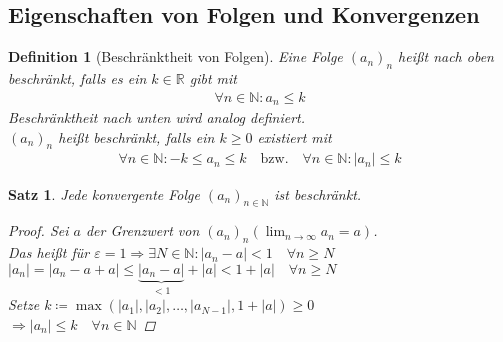 \documentclass[11pt, twoside, a4paper]{article}
\theoremstyle{plain}
\newtheorem{definition}[blockelement]{Definition}
\newtheorem{satz}[blockelement]{Satz}
\newcommand{\pair}[1]{\left(#1\right)}
\newcommand{\abs}[1]{\left|#1\right|}
\newcommand{\impl}[0]{\Rightarrow{}}
\newcommand{\definedas}[0]{\coloneqq}
\newcommand{\fromto}{\rightarrow{}}
\newcommand{\naturalnumbers}{\mathbb{N}}
\newcommand{\realnumbers}{\mathbb{R}}
\begin{document}

    \subsection{Eigenschaften von Folgen und Konvergenzen}

    \begin{definition}[Beschränktheit von Folgen]
        Eine Folge $(a_n)_n$ heißt nach oben beschränkt, falls es ein $k\in\realnumbers$ gibt mit
        \begin{align*}
            \forall n\in \naturalnumbers\colon a_n \leq k\tag{$k$ ist obere Schranke für $(a_n)_n$}
        \end{align*}
        Beschränktheit nach unten wird analog definiert.\\
        $(a_n)_n$ heißt beschränkt, falls ein $k\geq 0$ existiert mit
        \begin{align*}
            \forall n\in\naturalnumbers\colon -k \leq a_n \leq k\quad \text{bzw.}\quad \forall n\in\naturalnumbers\colon \abs{a_n} \leq k
        \end{align*}
    \end{definition}

    \begin{satz}
        \label{satz:konv-folg-beschr}
        Jede konvergente Folge $(a_n)_{n\in\naturalnumbers}$ ist beschränkt.
        \begin{proof}
            Sei $a$ der Grenzwert von $(a_n)_n$\quad $\pair{\lim_{n\fromto\infty} a_n = a}$.\\
            Das heißt für $\varepsilon = 1 \impl \exists N\in\naturalnumbers\colon \abs{a_n-a} < 1\quad\forall n\geq N$\\
            $\abs{a_n} = \abs{a_n-a+a} \leq \underbrace{\abs{a_n-a}}_{<1} + \abs{a} < 1+\abs{a} \quad \forall n\geq N$\\
            Setze $k\definedas \max\pair{\abs{a_1}, \abs{a_2}, \dots, \abs{a_{N-1}}, 1+\abs{a}} \geq 0$\\
            $\impl \abs{a_n} \leq k \quad\forall n\in\naturalnumbers$\qedhere
        \end{proof}
    \end{satz}
\end{document}
